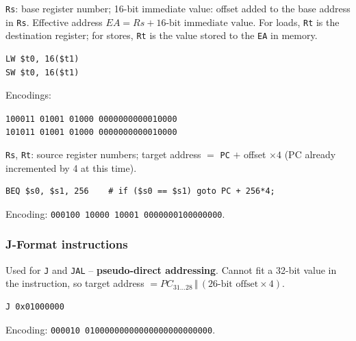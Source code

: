 \begin{eg}
\texttt{Rs}: base register number;
16-bit immediate value: offset added to the base address in \texttt{Rs}.
Effective address $EA = Rs + \text{16-bit immediate value}$. For loads,
\texttt{Rt} is the destination register; for stores, \texttt{Rt} is the
value stored to the \texttt{EA} in memory.
\begin{lstlisting}
LW $t0, 16($t1)
SW $t0, 16($t1)
\end{lstlisting}
Encodings:
\begin{center}
\texttt{100011 01001 01000 0000000000010000}\\
\texttt{101011 01001 01000 0000000000010000}
\end{center}
\end{eg}

\begin{eg}
\texttt{Rs}, \texttt{Rt}: source
register numbers; target address $=$ \texttt{PC} $+$ offset $\times 4$ (PC
already incremented by 4 at this time).
\begin{lstlisting}
BEQ $s0, $s1, 256    # if ($s0 == $s1) goto PC + 256*4;
\end{lstlisting}
Encoding: \texttt{000100 10000 10001 0000000100000000}.
\end{eg}

\subsubsection{J-Format instructions}

\begin{center}
\end{center}

Used for \texttt{J} and \texttt{JAL} -- \textbf{pseudo-direct addressing}.
Cannot fit a 32-bit value in the instruction, so target address $=
PC_{31\ldots28} \,\Vert\, (\text{26-bit offset} \times 4)$.
\begin{eg}[Jump]
\leavevmode
\begin{lstlisting}
J 0x01000000
\end{lstlisting}
Encoding: \texttt{000010 01000000000000000000000000}.
\end{eg}

